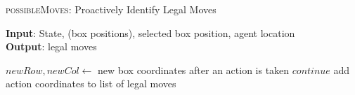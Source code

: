 \documentclass{article}
\begin{document}
\begin{algorithm}
    \caption{\textsc{possibleMoves}: Proactively Identify Legal Moves}\label{euclid}
    \hspace*{\algorithmicindent} \textbf{Input}: State, (box positions), selected box position, agent location\\
    \hspace*{\algorithmicindent} \textbf{Output}: legal moves
    \begin{algorithmic}
    
        \State $newRow, newCol \gets $ new box coordinates after an action is taken
            \State $continue$
        \EndIf
            \State add action coordinates to list of legal moves
        \EndIf
    \EndFor
    \end{algorithmic}
\end{algorithm}
\end{document}
